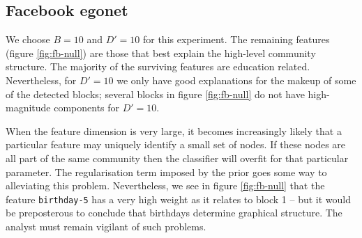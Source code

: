 \subsection{Facebook egonet}

We choose $B=10$ and $D'=10$ for this experiment. The remaining features (figure \ref{fig:fb-null}) are those that best explain the high-level community structure. The majority of the surviving features are education related. Nevertheless, for $D'=10$ we only have good explanations for the makeup of some of the detected blocks; several blocks in figure \ref{fig:fb-null} do not have high-magnitude components for $D'=10$.

When the feature dimension is very large, it becomes increasingly likely that a particular feature may uniquely identify a small set of nodes. If these nodes are all part of the same community then the classifier will overfit for that particular parameter. The regularisation term imposed by the prior goes some way to alleviating this problem. Nevertheless, we see in figure \ref{fig:fb-null} that the feature \verb*|birthday-5| has a very high weight as it relates to block 1 -- but it would be preposterous to conclude that birthdays determine graphical structure. The analyst must remain vigilant of such problems.

